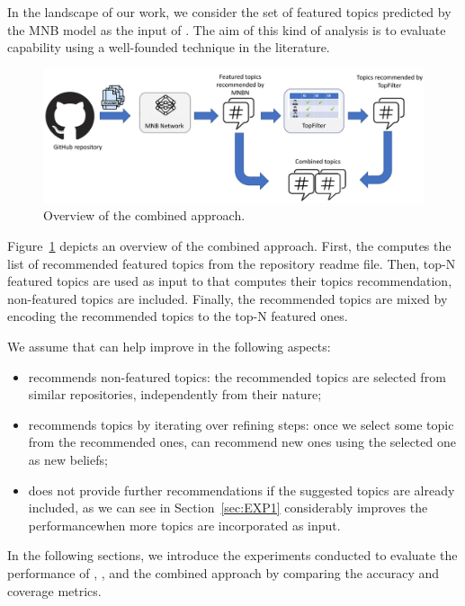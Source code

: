 In the landscape of our work, we consider the set of featured topics predicted by the MNB model as the input of \TF. The aim of this kind of analysis is to evaluate \TF capability using a well-founded technique in the literature.


\begin{figure}
	\centering
	\includegraphics[width=\linewidth]{figs/entangled}
	\caption{Overview of the combined approach.}
	\label{fig:entangled}
\end{figure}

Figure~\ref{fig:entangled} depicts an overview of the combined approach. First, the \MNB computes the list of recommended featured topics from the repository readme file. Then, top-N featured topics are used as input to \TF that computes their topics recommendation, \ie non-featured topics are included. Finally, the recommended topics are mixed by encoding the \TF recommended topics to the top-N featured ones.

We assume that \TF can help improve \MNB in the following aspects:
\begin{itemize}
	\item \TF recommends non-featured topics: the recommended topics are selected from similar repositories, independently from their nature;
	\item \TF recommends topics by iterating over refining steps: once we select some topic from the recommended ones, \TF can recommend new ones using the selected one as new beliefs;
	\item \MNB does not provide further recommendations if the suggested topics are already included, as we can see in Section~\ref{sec:EXP1} \TF considerably improves the performancewhen more topics are incorporated as input.
\end{itemize}

In the following sections, we introduce the experiments conducted to evaluate the performance of \TF, \MNB, and the combined approach by comparing the accuracy and coverage metrics.

